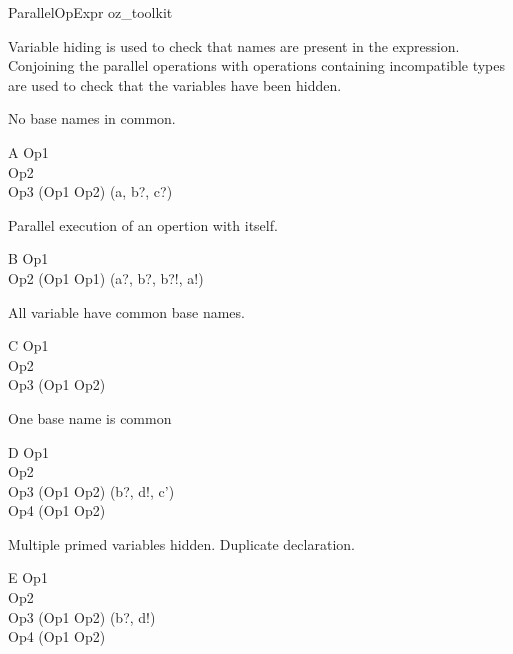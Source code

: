 \begin{zsection}
  \SECTION ParallelOpExpr \parents oz\_toolkit
\end{zsection}

Variable hiding is used to check that names are present in the
expression. Conjoining the parallel operations with operations
containing incompatible types are used to check that the variables
have been hidden.

No base names in common. 
\begin{class}{A}
  Op1 \\
  Op2 \\
  Op3 \sdef (Op1 \pll Op2) \hide (a, b?, c?)
\end{class}

Parallel execution of an opertion with itself.
\begin{class}{B}
  Op1 \\
  Op2 \sdef (Op1 \pll Op1) \hide (a?, b?, b?!, a!)
\end{class}

All variable have common base names.
\begin{class}{C}
  Op1 \\
  Op2 \\
  Op3 \sdef (Op1 \pll Op2) 
\end{class}

One base name is common
\begin{class}{D}
  Op1 \\
  Op2 \\
  Op3 \sdef (Op1 \pll Op2) \hide (b?, d!, c')\\
  Op4 \sdef (Op1 \pll Op2) 
\end{class}

Multiple primed variables hidden.
Duplicate declaration.
\begin{class}{E}
  Op1 \\
  Op2 \\
  Op3 \sdef (Op1 \pll Op2) \hide (b?, d!)\\
  Op4 \sdef (Op1 \pll Op2) 
\end{class}
